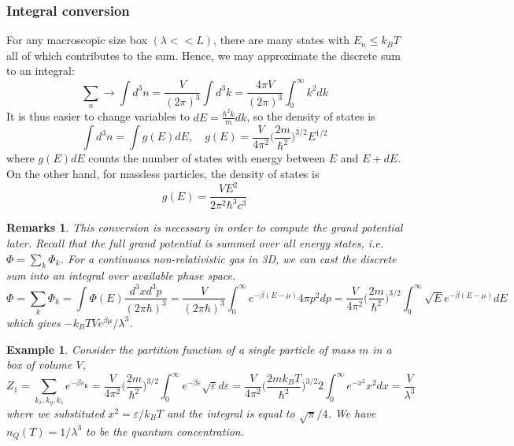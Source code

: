 \documentclass[a4paper]{article}
\newtheorem{eg}{Example}[section]
\newtheorem{remarks}{Remarks}[section]
\theoremstyle{new}
\begin{document}
\subsubsection{Integral conversion}
For any macroscopic size box $(\lambda<<L)$, there are many states with $E_n\leq k_BT$ all of which contributes to the sum. Hence, we may approximate the discrete sum to an integral:
$$\sum_n\rightarrow\int d^3n=\frac{V}{(2\pi)^3}\int d^3k=\frac{4\pi V}{(2\pi)^3}\int_0^\infty k^2dk$$
It is thus easier to change variables to $dE=\frac{\hbar^2k}{m}dk$, so the density of states is
$$\int d^3n=\int g(E)dE,\quad g(E)=\frac{V}{4\pi^2}\bigg(\frac{2m}{\hbar^2}\bigg)^{3/2}E^{1/2}$$
where $g(E)dE$ counts the number of states with energy between $E$ and $E+dE$. On the other hand, for massless particles, the density of states is
$$g(E)=\frac{VE^2}{2\pi^2\hbar^3c^3}$$
\begin{remarks}
This conversion is necessary in order to compute the grand potential later. Recall that the full grand potential is summed over all energy states, i.e. $\Phi=\sum_k\Phi_k$. For a continuous non-relativistic gas in 3D, we can cast the discrete sum into an integral over available phase space.
$$\Phi=\sum_k\Phi_k=\int\Phi(E)\frac{d^3xd^3p}{(2\pi\hbar)^3}=\frac{V}{(2\pi\hbar)^3}\int^\infty_0 e^{-\beta(E-\mu)}4\pi p^2dp=\frac{V}{4\pi^2}\bigg(\frac{2m}{\hbar^2}\bigg)^{3/2}\int_0^\infty\sqrt{E}e^{-\beta(E-\mu)}dE$$
which gives $-k_BTVe^{\beta\mu}/\lambda^3$. 
\end{remarks}
\begin{eg}
Consider the partition function of a single particle of mass $m$ in a box of volume $V$,
$$Z_1=\sum_{k_x,k_y,k_z}e^{-\beta\varepsilon_{\mathbf{k}}}=\frac{V}{4\pi^2}\bigg(\frac{2m}{\hbar^2}\bigg)^{3/2}\int_0^\infty e^{-\beta\varepsilon}\sqrt{\varepsilon}d\varepsilon=\frac{V}{4\pi^2}\bigg(\frac{2mk_BT}{\hbar^2}\bigg)^{3/2}2\int_0^\infty e^{-x^2}x^2dx=\frac{V}{\lambda^3}$$
where we substituted $x^2=\varepsilon/k_BT$ and the integral is equal to $\sqrt{\pi}/4$. We have $n_Q(T)=1/\lambda^3$ to be the quantum concentration.
\end{eg}

\newpage
\end{document}
